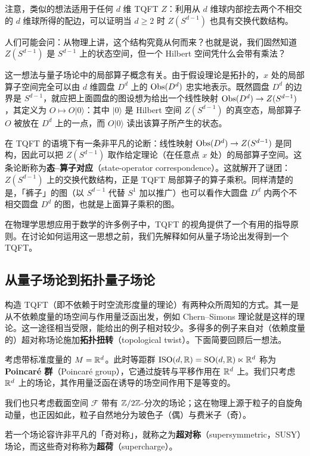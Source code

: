 注意，类似的想法适用于任何 $d$ 维 TQFT $Z$：利用从 $d$ 维球内部挖去两个不相交的 $d$ 维球所得的配边，可以证明当 $d\geq 2$ 时 $Z(S^{d-1})$ 也具有交换代数结构。

人们可能会问：从物理上讲，这个结构究竟从何而来？也就是说，我们固然知道 $Z(S^{d-1})$ 是 $S^{d-1}$ 上的状态空间，但一个 Hilbert 空间凭什么会带有乘法？

这一想法与量子场论中的局部算子概念有关。由于假设理论是拓扑的，$x$ 处的局部算子空间完全可以由 $d$ 维圆盘 $D^d$ 上的 $\operatorname{Obs}(D^d)$ 忠实地表示。既然圆盘 $D^d$ 的边界是 $S^{d-1}$，就应把上面圆盘的图设想为给出一个线性映射 $\operatorname{Obs}(D^d)\to Z(S^{d-1})$，其定义为 $O\mapsto O|0\rangle$：其中 $|0\rangle$ 是 Hilbert 空间 $Z(S^{d-1})$ 的真空态，局部算子 $O$ 被放在 $D^d$ 上的一点，而 $O|0\rangle$ 读出该算子所产生的状态。

在 TQFT 的语境下有一条非平凡的论断：线性映射 $\operatorname{Obs}(D^d)\to Z(S^{d-1})$ 是同构，因此可以把 $Z(S^{d-1})$ 取作给定理论（在任意点 $x$ 处）的局部算子空间。这条论断称为\textbf{态–算子对应}（state-operator correspondence）。这就解开了谜团：$Z(S^{d-1})$ 上的交换代数结构，正是 TQFT 局部算子的算子乘积。同样清楚的是，「裤子」的图（以 $S^{d-1}$ 代替 $S^1$ 加以推广）也可以看作大圆盘 $D^d$ 内两个不相交圆盘 $D^d$ 的图，也就是上面算子乘积的图。

在物理学思想应用于数学的许多例子中，TQFT 的视角提供了一个有用的指导原则。在讨论如何运用这一思想之前，我们先解释如何从量子场论出发得到一个 TQFT。

\subsection{从量子场论到拓扑量子场论}

构造 TQFT（即不依赖于时空流形度量的理论）有两种众所周知的方式。其一是从不依赖度量的场空间与作用量泛函出发，例如 Chern–Simons 理论就是这样的理论。这一途径相当受限，能给出的例子相对较少。多得多的例子来自对（依赖度量的）超对称场论施加\textbf{拓扑扭转}（topological twist）。下面简要回顾后一想法。

考虑带标准度量的 $M=\mathbb{R}^d$。此时等距群 $\operatorname{ISO}(d,\mathbb{R})=\operatorname{SO}(d,\mathbb{R})\ltimes \mathbb{R}^d$ 称为 \textbf{Poincaré 群}（Poincaré group），它通过旋转与平移作用在 $\mathbb{R}^d$ 上。我们只考虑 $\mathbb{R}^d$ 上的场论，其作用量泛函在诱导的场空间作用下是等变的。

我们也只考虑截面空间 $\mathcal{F}$ 带有 $\mathbb{Z}/2\mathbb{Z}$-分次的场论；这在物理上源于粒子的自旋角动量，也正因如此，粒子自然地分为玻色子（偶）与费米子（奇）。

若一个场论容许非平凡的「奇对称」，就称之为\textbf{超对称}（supersymmetric，SUSY）场论，而这些奇对称称为\textbf{超荷}（supercharge）。


